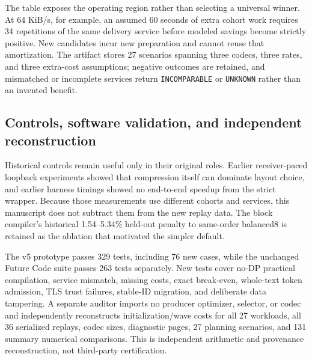 The table exposes the operating region rather than selecting a universal winner. At 64 KiB/s, for example, an assumed 60 seconds of extra cohort work requires 34 repetitions of the same delivery service before modeled savings become strictly positive. New candidates incur new preparation and cannot reuse that amortization. The artifact stores 27 scenarios spanning three codecs, three rates, and three extra-cost assumptions; negative outcomes are retained, and mismatched or incomplete services return \texttt{INCOMPARABLE} or \texttt{UNKNOWN} rather than an invented benefit.

\subsection{Controls, software validation, and independent reconstruction}
Historical controls remain useful only in their original roles. Earlier receiver-paced loopback experiments showed that compression itself can dominate layout choice, and earlier harness timings showed no end-to-end speedup from the strict wrapper. Because those measurements use different cohorts and services, this manuscript does not subtract them from the new replay data. The block compiler's historical 1.54--5.34\% held-out penalty to same-order balanced8 is retained as the ablation that motivated the simpler default.

The v5 prototype passes 329 tests, including 76 new cases, while the unchanged Future Code suite passes 263 tests separately. New tests cover no-DP practical compilation, service mismatch, missing costs, exact break-even, whole-text token admission, TLS trust failures, stable-ID migration, and deliberate data tampering. A separate auditor imports no producer optimizer, selector, or codec and independently reconstructs initialization/wave costs for all 27 workloads, all 36 serialized replays, codec sizes, diagnostic pages, 27 planning scenarios, and 131 summary numerical comparisons. This is independent arithmetic and provenance reconstruction, not third-party certification.
